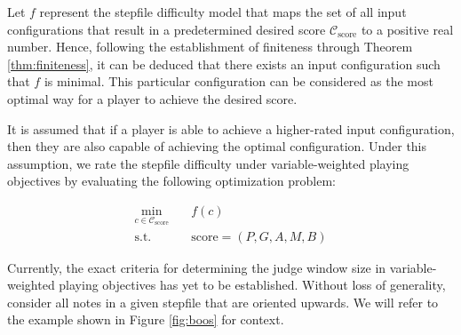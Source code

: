 Let $f$ represent the stepfile difficulty model that maps the set of all input configurations that result in a predetermined desired score $\mathcal{C}_{\text{score}}$ to a positive real number. Hence, following the establishment of finiteness through Theorem \ref{thm:finiteness}, it can be deduced that there exists an input configuration such that $f$ is minimal. This particular configuration can be considered as the most optimal way for a player to achieve the desired score.

\vspace{2mm}

It is assumed that if a player is able to achieve a higher-rated input configuration, then they are also capable of achieving the optimal configuration. Under this assumption, we rate the stepfile difficulty under variable-weighted playing objectives by evaluating the following optimization problem:

\begin{equation*}
\begin{aligned}
\min_{c \in \mathcal{C}_{\text{score}}} \quad & f(c)\\
\textrm{s.t.} \quad & \text{score} = (P, G, A, M, B)  
\end{aligned}
\end{equation*}

Currently, the exact criteria for determining the judge window size in variable-weighted playing objectives has yet to be established. Without loss of generality, consider all notes in a given stepfile that are oriented upwards. We will refer to the example shown in Figure \ref{fig:boos} for context.

